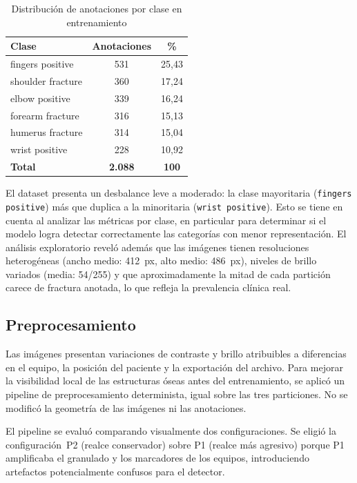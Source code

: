 \documentclass[conference]{IEEEtran}
\begin{document}
\begin{table}[htbp]
\caption{Distribución de anotaciones por clase en entrenamiento}
\label{tab:clases}
\begin{center}
\begin{tabular}{lcc}
\toprule
\textbf{Clase} & \textbf{Anotaciones} & \textbf{\%} \\
\midrule
fingers positive  & 531 & 25{,}43 \\
shoulder fracture & 360 & 17{,}24 \\
elbow positive    & 339 & 16{,}24 \\
forearm fracture  & 316 & 15{,}13 \\
humerus fracture  & 314 & 15{,}04 \\
wrist positive    & 228 & 10{,}92 \\
\midrule
\textbf{Total}    & \textbf{2.088} & \textbf{100} \\
\bottomrule
\end{tabular}
\end{center}
\end{table}

El dataset presenta un desbalance leve a moderado: la clase mayoritaria
(\texttt{fingers positive}) más que duplica a la minoritaria (\texttt{wrist
positive}). Esto se tiene en cuenta al analizar las métricas por clase, en
particular para determinar si el modelo logra detectar correctamente las
categorías con menor representación. El análisis exploratorio reveló además que
las imágenes tienen resoluciones heterogéneas (ancho medio: 412~px, alto medio:
486~px), niveles de brillo variados (media: 54/255) y que aproximadamente la mitad
de cada partición carece de fractura anotada, lo que refleja la prevalencia clínica
real.

\subsection{Preprocesamiento}

Las imágenes presentan variaciones de contraste y brillo atribuibles a diferencias
en el equipo, la posición del paciente y la exportación del archivo. Para mejorar
la visibilidad local de las estructuras óseas antes del entrenamiento, se aplicó un
pipeline de preprocesamiento determinista, igual sobre las tres particiones. No se
modificó la geometría de las imágenes ni las anotaciones.

El pipeline se evaluó comparando visualmente dos configuraciones. Se eligió la
configuración~P2 (realce conservador) sobre P1 (realce más agresivo) porque P1
amplificaba el granulado y los marcadores de los equipos, introduciendo artefactos
potencialmente confusos para el detector.
\end{document}
